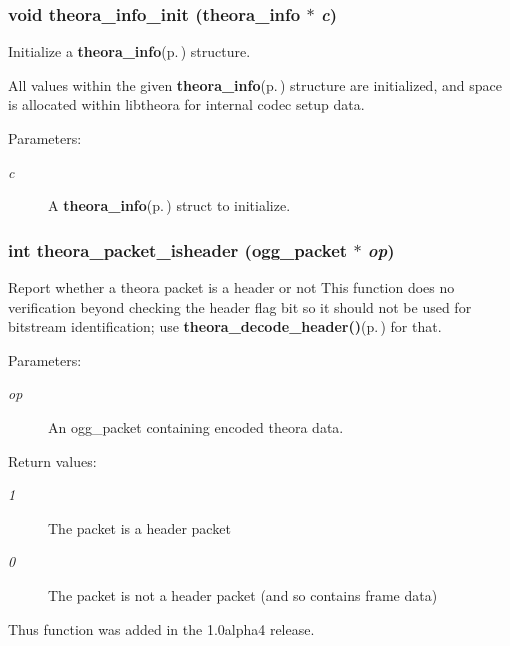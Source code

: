 \subsubsection{\setlength{\rightskip}{0pt plus 5cm}void theora\_\-info\_\-init ({\bf theora\_\-info} $\ast$ {\em c})}\label{theora_8h_a29}


Initialize a {\bf theora\_\-info}{\rm (p.\,\pageref{structtheora__info})} structure. 

All values within the given {\bf theora\_\-info}{\rm (p.\,\pageref{structtheora__info})} structure are initialized, and space is allocated within libtheora for internal codec setup data. \begin{Desc}
\item[Parameters:]
\begin{description}
\item[{\em c}]A {\bf theora\_\-info}{\rm (p.\,\pageref{structtheora__info})} struct to initialize. \end{description}
\end{Desc}
\subsubsection{\setlength{\rightskip}{0pt plus 5cm}int theora\_\-packet\_\-isheader (ogg\_\-packet $\ast$ {\em op})}\label{theora_8h_a25}


Report whether a theora packet is a header or not This function does no verification beyond checking the header flag bit so it should not be used for bitstream identification; use {\bf theora\_\-decode\_\-header()}{\rm (p.\,\pageref{theora_8h_a21})} for that. 

\begin{Desc}
\item[Parameters:]
\begin{description}
\item[{\em op}]An ogg\_\-packet containing encoded theora data. \end{description}
\end{Desc}
\begin{Desc}
\item[Return values:]
\begin{description}
\item[{\em 1}]The packet is a header packet \item[{\em 0}]The packet is not a header packet (and so contains frame data)\end{description}
\end{Desc}
Thus function was added in the 1.0alpha4 release. 
